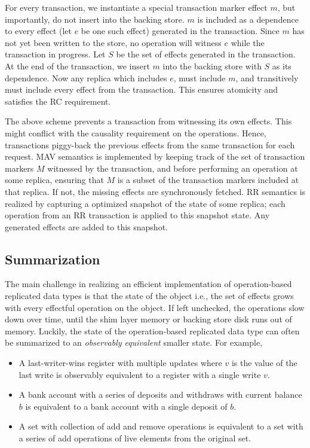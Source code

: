 For every transaction, we instantiate a special transaction marker effect $m$,
but importantly, do not insert into the backing store. $m$ is included as a
dependence to every effect (let $e$ be one such effect) generated in the
transaction. Since $m$ has not yet been written to the store, no operation will
witness $e$ while the transaction in progress. Let $S$ be the set of effects
generated in the transaction. At the end of the transaction, we insert $m$ into
the backing store with $S$ as its dependence. Now any replica which includes
$e$, must include $m$, and transitively must include every effect from the
transaction. This ensures atomicity and satisfies the RC requirement.

The above scheme prevents a transaction from witnessing its own effects. This
might conflict with the causality requirement on the operations. Hence,
transactions piggy-back the previous effects from the same transaction for each
request. MAV semantics is implemented by keeping track of the set of
transaction markers $M$ witnessed by the transaction, and before performing an
operation at some replica, ensuring that $M$ is a subset of the transaction
markers included at that replica. If not, the missing effects are synchronously
fetched. RR semantics is realized by capturing a optimized snapshot of the
state of some replica; each operation from an RR transaction is applied to this
snapshot state. Any generated effects are added to this snapshot.

\subsection{Summarization}

The main challenge in realizing an efficient implementation of operation-based
replicated data types is that the state of the object i.e., the set of effects
grows with every effectful operation on the object. If left unchecked, the
operations slow down over time, until the shim layer memory or backing store
disk runs out of memory. Luckily, the state of the operation-based replicated
data type can often be summarized to an \emph{observably equivalent} smaller
state. For example,

\begin{itemize}
\setlength{\itemsep}{2pt}
\item A last-writer-wins register with multiple updates where $v$ is the value
of the last write is observably equivalent to a register with a single write
$v$.

\item A bank account with a series of deposits and withdraws with current
balance $b$ is equivalent to a bank account with a single deposit of $b$.

\item A set with collection of add and remove operations is equivalent to a set
with a series of add operations of live elements from the original set.
\end{itemize}

